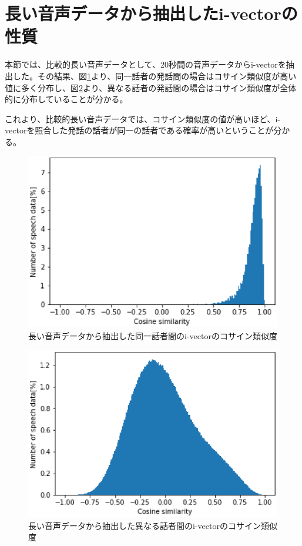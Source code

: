\section{長い音声データから抽出したi-vectorの性質}
本節では、比較的長い音声データとして、20秒間の音声データからi-vectorを抽出した。その結果、図\ref{fig:iv_same_long}より、同一話者の発話間の場合はコサイン類似度が高い値に多く分布し、図\ref{fig:iv_other_long}より、異なる話者の発話間の場合はコサイン類似度が全体的に分布していることが分かる。\par
これより、比較的長い音声データでは、コサイン類似度の値が高いほど、i-vectorを照合した発話の話者が同一の話者である確率が高いということが分かる。

\begin{figure}[htb]
  \begin{center}
    \includegraphics{../../image/same_sp_long.eps}
  \end{center}
  \caption{長い音声データから抽出した同一話者間のi-vectorのコサイン類似度}
  \label{fig:iv_same_long}
\end{figure}

\begin{figure}[htb]
  \begin{center}
    \includegraphics{../../image/other_sp_long.eps}
  \end{center}
  \caption{長い音声データから抽出した異なる話者間のi-vectorのコサイン類似度}
  \label{fig:iv_other_long}
\end{figure}

